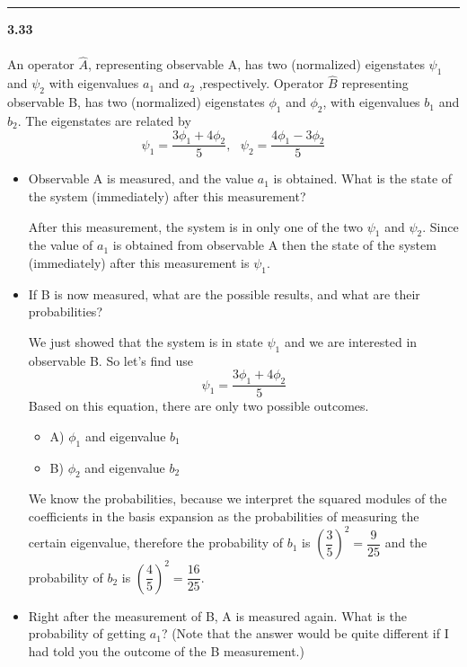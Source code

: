 \documentclass[fleqn]{article}
\begin{document}
  \rule{15cm}{1pt}

  \textbf{3.33} \\ \\
  An operator $\hat{A}$, representing observable
  A, has two (normalized) eigenstates $\psi_1$ and $\psi_2$ with eigenvalues $a_1$ and $a_2$
  ,respectively. Operator $\hat{B}$ representing observable B, has two (normalized)
  eigenstates $\phi_1$ and $\phi_2$, with eigenvalues $b_1$ and $b_2$. The eigenstates are related
  by
  $$\psi_1=\dfrac{3\phi_1+4\phi_2}{5}, ~~~ \psi_2=\dfrac{4\phi_1-3\phi_2}{5}$$
  \begin{itemize}
    \item Observable A is measured, and the value $a_1$ is obtained. What is the state
    of the system (immediately) after this measurement?

      \textcolor{hwColor}{
        After this measurement, the system is in only one of the two $\psi_1$ and $\psi_2$. 
        Since the value of $a_1$ is obtained from observable A then the state of the system 
        (immediately) after this measurement is $\psi_1$.
      }

    \item If B is now measured, what are the possible results, and what are their
    probabilities?

      \textcolor{hwColor}{
        We just showed that the system is in state $\psi_1$ and we are interested in observable B. So let's find
        use $$\psi_1=\dfrac{3\phi_1+4\phi_2}{5}$$
        Based on this equation, there are only two possible outcomes.
        \\
        \begin{itemize}
          \item A) $\phi_1$ and eigenvalue $b_1$
          \\
          \item B) $\phi_2$ and eigenvalue $b_2$ 
        \end{itemize}
      }

      \textcolor{hwColor}{
        We know the probabilities, because we interpret the squared modules of the coefficients in the 
        basis expansion as the probabilities of measuring the certain eigenvalue, therefore the probability
        of $b_1$ is $\left(\dfrac{3}{5}\right)^2=\dfrac{9}{25}$ and the probability of $b_2$ is 
        $\left(\dfrac{4}{5}\right)^2=\dfrac{16}{25}$.
      }

    \item Right after the measurement of B, A is measured again. What is the
    probability of getting $a_1$? (Note that the answer would be quite different if
    I had told you the outcome of the B measurement.)


\end{itemize}
\end{document}

